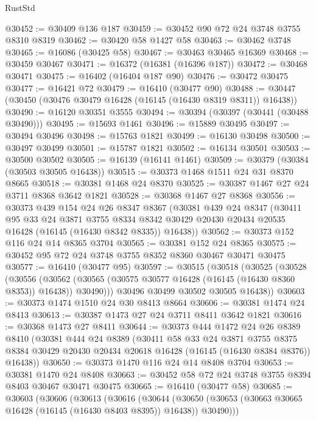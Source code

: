 \begin{lexlean}{RustStd}
\begin{coremodule}
@30452 := @30409 @136 @187
@30459 := @30452 @90 @72 @24 @3748 @3755 @8310 @8319
@30462 := @30420 @58 @1427 @58
@30463 := @30462 @3748
@30465 := @16086 (@30425 @58)
@30467 := @30463 @30465 @16369
@30468 := @30459 @30467
@30471 := @16372 (@16381 (@16396 @187))
@30472 := @30468 @30471
@30475 := @16402 (@16404 @187 @90)
@30476 := @30472 @30475
@30477 := @16421 @72
@30479 := @16410 (@30477 @90)
@30488 := @30447 (@30450 (@30476 @30479 @16428 (@16145 (@16430 @8319 @8311)) @16438))
@30490 := @16120 @30351 @3555
@30494 := @30394 (@30397 (@30441 (@30488 @30490)))
@30495 := @15693 @1461
@30496 := @15889 @30495
@30497 := @30494 @30496
@30498 := @15763 @1821
@30499 := @16130 @30498
@30500 := @30497 @30499
@30501 := @15787 @1821
@30502 := @16134 @30501
@30503 := @30500 @30502
@30505 := @16139 (@16141 @1461)
@30509 := @30379 (@30384 (@30503 @30505 @16438))
@30515 := @30373 @1468 @1511 @24 @31 @8370 @8665
@30518 := @30381 @1468 @24 @8370
@30525 := @30387 @1467 @27 @24 @3711 @8368 @3642 @1821
@30528 := @30368 @1467 @27 @8368
@30556 := @30373
    @439
    @154
    @24
    @26
    @8347
    @8367
    (@30381
      @439
      @24
      @8347
      (@30411
        @95
        @33
        @24
        @3871
        @3755
        @8334
        @8342
        @30429
        @20430
        @20434
        @20535
        @16428
        (@16145 (@16430 @8342 @8335))
        @16438))
@30562 := @30373 @152 @116 @24 @14 @8365 @3704
@30565 := @30381 @152 @24 @8365
@30575 := @30452 @95 @72 @24 @3748 @3755 @8352 @8360 @30467 @30471 @30475
@30577 := @16410 (@30477 @95)
@30597 := @30515
    (@30518
      (@30525
        (@30528
          (@30556
            (@30562 (@30565 (@30575 @30577 @16428 (@16145 (@16430 @8360 @8353)) @16438)) @30490)))
        @30496
        @30499
        @30502
        @30505
        @16438))
@30603 := @30373 @1474 @1510 @24 @30 @8413 @8664
@30606 := @30381 @1474 @24 @8413
@30613 := @30387 @1473 @27 @24 @3711 @8411 @3642 @1821
@30616 := @30368 @1473 @27 @8411
@30644 := @30373
    @444
    @1472
    @24
    @26
    @8389
    @8410
    (@30381
      @444
      @24
      @8389
      (@30411
        @58
        @33
        @24
        @3871
        @3755
        @8375
        @8384
        @30429
        @20430
        @20434
        @20618
        @16428
        (@16145 (@16430 @8384 @8376))
        @16438))
@30650 := @30373 @1470 @116 @24 @14 @8408 @3704
@30653 := @30381 @1470 @24 @8408
@30663 := @30452 @58 @72 @24 @3748 @3755 @8394 @8403 @30467 @30471 @30475
@30665 := @16410 (@30477 @58)
@30685 := @30603
    (@30606
      (@30613
        (@30616
          (@30644
            (@30650 (@30653 (@30663 @30665 @16428 (@16145 (@16430 @8403 @8395)) @16438)) @30490)))

\end{coremodule}
\end{lexlean}
